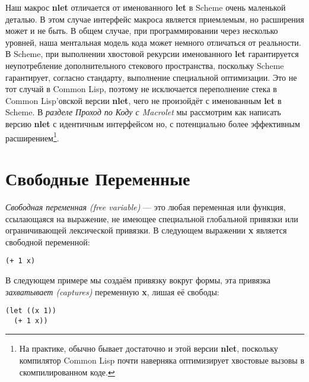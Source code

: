 Наш макрос \textbf{nlet} отличается от именованного \textbf{let} в Scheme очень маленькой деталью. В этом случае интерфейс макроса является приемлемым, но расширения может и не быть. В общем случае, при программировании через несколько уровней, наша ментальная модель кода может немного отличаться от реальности. В Scheme, при выполнении хвостовой рекурсии именованного \textbf{let} гарантируется неупотребление дополнительного стекового пространства, поскольку Scheme гарантирует, согласно стандарту, выполнение специальной оптимизации. Это не тот случай в Common Lisp, поэтому не исключается переполнение стека в Common Lisp'овской версии \textbf{nlet}, чего не произойдёт с именованным \textbf{let} в Scheme. В \emph{разделе Проход по Коду с Macrolet} мы рассмотрим как написать версию \textbf{nlet} с идентичным интерфейсом но, с потенциально более эффективным расширением\footnote{На практике, обычно бывает достаточно и этой версии \textbf{nlet}, поскольку компилятор Common Lisp почти наверняка оптимизирует хвостовые вызовы в скомпилированном коде.}.

\section{Свободные Переменные}\label{section_free_variables}

\emph{Свободная переменная (free variable)} --- это любая переменная или функция, ссылающаяся на выражение, не имеющее специальной глобальной привязки или ограничивающей лексической привязки. В следующем выражении \textbf{x} является свободной переменной:

\begin{verbatim}
(+ 1 x)
\end{verbatim}

В следующем примере мы создаём привязку вокруг формы, эта привязка \emph{захватывает (captures)} переменную \textbf{x}, лишая её свободы:

\begin{verbatim}
(let ((x 1))
  (+ 1 x))
\end{verbatim}

